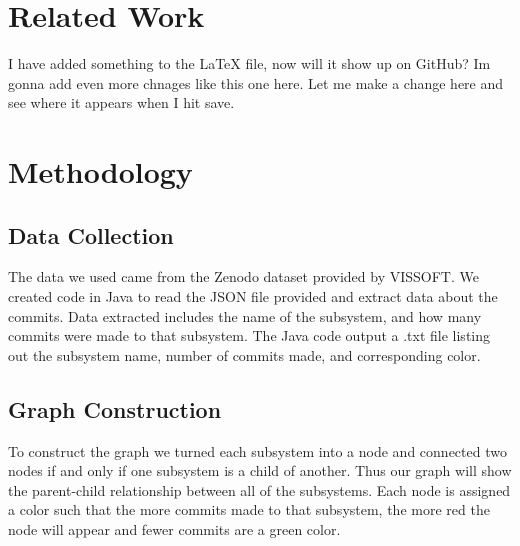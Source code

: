 \documentclass[conference]{IEEEtran}
\begin{document}
\section{Related Work}


I have added something to the LaTeX file, now will it show up on GitHub? Im gonna add even more chnages like this one here. Let me make a change here and see where it appears when I hit save.

\section{Methodology}

\subsection{Data Collection}
The data we used came from the Zenodo dataset provided by VISSOFT. We created code in Java to read the JSON file provided and extract data about the commits. Data extracted includes the name of the subsystem, and how many commits were made to that subsystem. The Java code output a .txt file listing out the subsystem name, number of commits made, and corresponding color.

\subsection{Graph Construction}
To construct the graph we turned each subsystem into a node and connected two nodes if and only if one subsystem is a child of another. Thus our graph will show the parent-child relationship between all of the subsystems. Each node is assigned a color such that the more commits made to that subsystem, the more red the node will appear and fewer commits are a green color.
\end{document}
